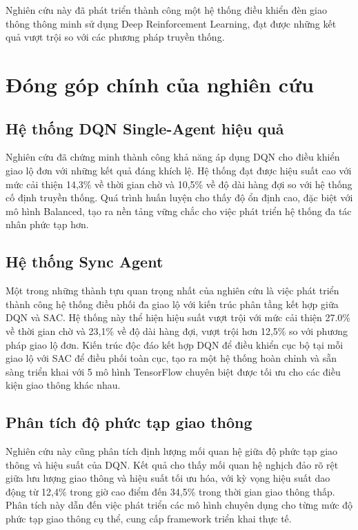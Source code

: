 Nghiên cứu này đã phát triển thành công một hệ thống điều khiển đèn giao thông thông minh sử dụng Deep Reinforcement Learning, đạt được những kết quả vượt trội so với các phương pháp truyền thống.

\section{Đóng góp chính của nghiên cứu}

\subsection{Hệ thống DQN Single-Agent hiệu quả}
Nghiên cứu đã chứng minh thành công khả năng áp dụng DQN cho điều khiển giao lộ đơn với những kết quả đáng khích lệ. Hệ thống đạt được hiệu suất cao với mức cải thiện 14,3\% về thời gian chờ và 10,5\% về độ dài hàng đợi so với hệ thống cố định truyền thống. Quá trình huấn luyện cho thấy độ ổn định cao, đặc biệt với mô hình Balanced, tạo ra nền tảng vững chắc cho việc phát triển hệ thống đa tác nhân phức tạp hơn.

\subsection{Hệ thống Sync Agent}
Một trong những thành tựu quan trọng nhất của nghiên cứu là việc phát triển thành công hệ thống điều phối đa giao lộ với kiến trúc phân tầng kết hợp giữa DQN và SAC. Hệ thống này thể hiện hiệu suất vượt trội với mức cải thiện 27.0\% về thời gian chờ và 23,1\% về độ dài hàng đợi, vượt trội hơn 12,5\% so với phương pháp giao lộ đơn. Kiến trúc độc đáo kết hợp DQN để điều khiển cục bộ tại mỗi giao lộ với SAC để điều phối toàn cục, tạo ra một hệ thống hoàn chỉnh và sẵn sàng triển khai với 5 mô hình TensorFlow chuyên biệt được tối ưu cho các điều kiện giao thông khác nhau.

\subsection{Phân tích độ phức tạp giao thông}
Nghiên cứu này cũng phân tích định lượng mối quan hệ giữa độ phức tạp giao thông và hiệu suất của DQN. Kết quả cho thấy mối quan hệ nghịch đảo rõ rệt giữa lưu lượng giao thông và hiệu suất tối ưu hóa, với kỳ vọng hiệu suất dao động từ 12,4\% trong giờ cao điểm đến 34,5\% trong thời gian giao thông thấp. Phân tích này dẫn đến việc phát triển các mô hình chuyên dụng cho từng mức độ phức tạp giao thông cụ thể, cung cấp framework triển khai thực tế.

